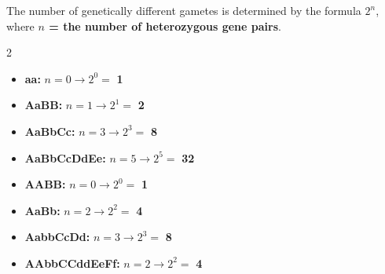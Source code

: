 \documentclass[11pt, letterpaper]{article}
\begin{document}
\begin{tcolorbox}[colback=part5bg, colframe=sectionteal, title={\bfseries Part 1: Calculating Gamete Diversity}, arc=3pt, boxrule=1pt]
The number of genetically different gametes is determined by the formula $2^n$, where \textbf{$n$ = the number of heterozygous gene pairs}.

\begin{multicols}{2}
\begin{itemize}[noitemsep, leftmargin=*]
    \item \textbf{aa:} $n=0 \to 2^0 =$ \textbf{1}
    \item \textbf{AaBB:} $n=1 \to 2^1 =$ \textbf{2}
    \item \textbf{AaBbCc:} $n=3 \to 2^3 =$ \textbf{8}
    \item \textbf{AaBbCcDdEe:} $n=5 \to 2^5 =$ \textbf{32}
    \item \textbf{AABB:} $n=0 \to 2^0 =$ \textbf{1}
    \item \textbf{AaBb:} $n=2 \to 2^2 =$ \textbf{4}
    \item \textbf{AabbCcDd:} $n=3 \to 2^3 =$ \textbf{8}
    \item \textbf{AAbbCCddEeFf:} $n=2 \to 2^2 =$ \textbf{4}
\end{itemize}
\end{multicols}
\end{tcolorbox}
\end{document}
